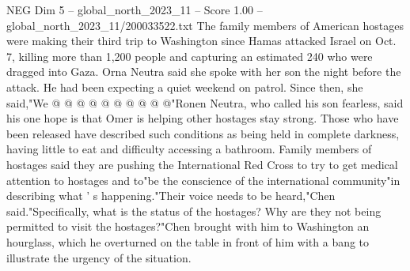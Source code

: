 \begin{textsample}{NEG Dim 5 – global\_north\_2023\_11 – Score 1.00 – global\_north\_2023\_11/200033522.txt}
The family members of American hostages were making their third trip to Washington since Hamas attacked Israel on Oct. 7, killing more than 1,200 people and capturing an estimated 240 who were dragged into Gaza.
Orna Neutra said she spoke with her son the night before the attack.
He had been expecting a quiet weekend on patrol.
Since then, she said,"We @ @ @ @ @ @ @ @ @ @"Ronen Neutra, who called his son fearless, said his one hope is that Omer is helping other hostages stay strong.
Those who have been released have described such conditions as being held in complete darkness, having little to eat and difficulty accessing a bathroom.
Family members of hostages said they are pushing the International Red Cross to try to get medical attention to hostages and to"be the conscience of the international community"in describing what ' s happening."Their voice needs to be heard,"Chen said."Specifically, what is the status of the hostages?
Why are they not being permitted to visit the hostages?"Chen brought with him to Washington an hourglass, which he overturned on the table in front of him with a bang to illustrate the urgency of the situation.

\end{textsample}
